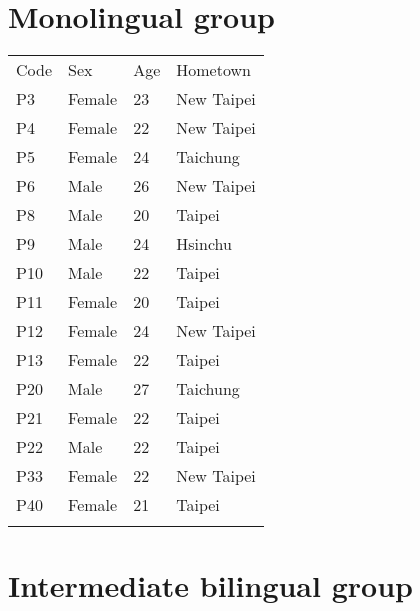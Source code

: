 
\label{Appendix:ParticipantInfo}

\section{Monolingual group}

\begin{flushleft}
\begin{table}[hbt!]
\begin{tabularx}{\textwidth}{|l||X|X|X|}

\hhline{~~~~}\noalign{\vspace*{\doublerulesep}}
\hhline{-||---}
Code&Sex&Age&Hometown\\
\hhline{=::===}
P3&Female&23&New Taipei\\
\hhline{-||---}
P4&Female&22&New Taipei\\
\hhline{-||---}
P5&Female&24&Taichung\\
\hhline{-||---}
P6&Male&26&New Taipei\\
\hhline{-||---}
P8&Male&20&Taipei\\
\hhline{-||---}
P9&Male&24&Hsinchu\\
\hhline{-||---}
P10&Male&22&Taipei\\
\hhline{-||---}
P11&Female&20&Taipei\\
\hhline{-||---}
P12&Female&24&New Taipei\\
\hhline{-||---}
P13&Female&22&Taipei\\
\hhline{-||---}
P20&Male&27&Taichung\\
\hhline{-||---}
P21&Female&22&Taipei\\
\hhline{-||---}
P22&Male&22&Taipei\\
\hhline{-||---}
P33&Female&22&New Taipei\\
\hhline{-||---}
P40&Female&21&Taipei\\
\hhline{-||---}

\end{tabularx}
\end{table}
\end{flushleft}

\pagebreak
\section{Intermediate bilingual group}

